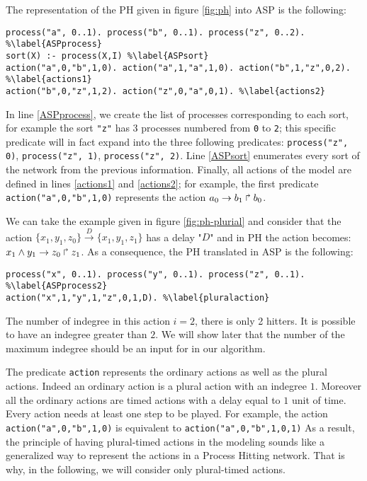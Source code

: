 \begin{example}
\label{ex1:asp-ph}
The representation of the PH given in figure \ref{fig:ph} into ASP is the following:
\begin{lstlisting}
process("a", 0..1). process("b", 0..1). process("z", 0..2). %\label{ASPprocess}
sort(X) :- process(X,I) %\label{ASPsort}
action("a",0,"b",1,0). action("a",1,"a",1,0). action("b",1,"z",0,2). %\label{actions1}
action("b",0,"z",1,2). action("z",0,"a",0,1). %\label{actions2}
\end{lstlisting}
In line \ref{ASPprocess}, we create the list of processes corresponding to each sort,
for example the sort \texttt{"z"} has 3 processes numbered from \texttt{0} to \texttt{2};
this specific predicate will in fact expand into the three following predicates:
\texttt{process("z", 0)}, \texttt{process("z", 1)}, \texttt{process("z", 2)}.
Line \ref{ASPsort} enumerates every sort of the network from the previous information.
Finally, all actions of the model are defined in lines \ref{actions1} and \ref{actions2};
for example, the first predicate \texttt{action("a",0,"b",1,0)} represents the action
$a_0\rightarrow b_1\Rsh b_0$.
\end{example}

\begin{example}
\label{ex2:ph-asp}
We can take the example given in figure \ref{fig:ph-plurial} and consider that the action  $\{x_1, y_1, z_0 \} \xrightarrow{D} \{x_1, y_1, z_1 \} $  has a delay "$D$" and in PH the action becomes: $x_1 \wedge y_1\rightarrow z_0\Rsh z_1$. As a consequence, the PH translated in ASP is the following:
\begin{lstlisting}
process("x", 0..1). process("y", 0..1). process("z", 0..1). %\label{ASPprocess2}
action("x",1,"y",1,"z",0,1,D). %\label{pluralaction}
\end{lstlisting}
The number of indegree in this action $i=2$, there is only 2 hitters. It is possible to have an indegree greater than $2$. We will show later that the number of the maximum indegree should be an input for in our algorithm.
\end{example}

The predicate \texttt{action} represents the ordinary actions as well as the plural actions. Indeed an ordinary action is a plural action with an indegree $1$. Moreover all the ordinary actions are timed actions with a delay equal to $1$ unit of time. Every action needs at least one step to be played. For example, the action \texttt{action("a",0,"b",1,0)} is equivalent to \texttt{action("a",0,"b",1,0,1)}
As a result, the principle of having plural-timed actions in the modeling sounds like a generalized way to represent the actions in a Process Hitting network. That is why, in the following, we will consider only plural-timed actions. 
	
